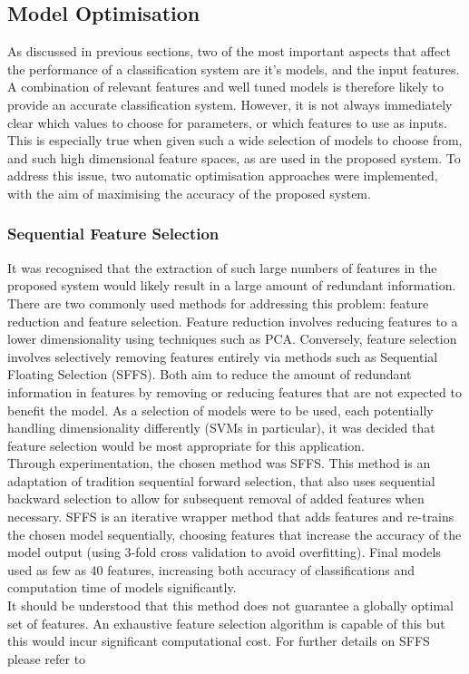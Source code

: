 \documentclass[titlepage, 12pt]{scrartcl} \usepackage{enumitem}
\begin{document}
\subsection{Model Optimisation}\label{optimise}
As discussed in previous sections, two of the most important aspects that affect
the performance of a classification system are it's models, and the input
features. A combination of relevant features and well tuned models is therefore
likely to provide an accurate classification system. However, it is not always
immediately clear which values to choose for parameters, or which features to use as
inputs. This is especially true when given such a wide selection of models to
choose from, and such high dimensional feature spaces, as are used in the
proposed system. To address this issue, two automatic optimisation approaches
were implemented, with the aim of maximising the accuracy of the proposed
system.

\subsubsection{Sequential Feature Selection}\label{SFS}
It was recognised that the extraction of such large numbers of features in the
proposed system would likely result in a large amount of redundant information.
There are two commonly used methods for addressing this problem: feature
reduction and feature selection. Feature reduction involves reducing features
to a lower dimensionality using techniques such as PCA. Conversely, feature
selection involves selectively removing features entirely via methods such as
Sequential Floating Selection (SFFS). Both aim to reduce the amount of
redundant information in features by removing or reducing features that are not
expected to benefit the model. As a selection of models were to be used, each
potentially handling dimensionality differently (SVMs in particular), it was
decided that feature selection would be most appropriate for this
application.\\

Through experimentation, the chosen method was SFFS. This method is an adaptation
of tradition sequential forward selection, that also uses sequential backward
selection to allow for subsequent removal of added features when necessary.
SFFS is an iterative wrapper method that adds features and re-trains the chosen
model sequentially, choosing features that increase the accuracy of the model
output (using 3-fold cross validation to avoid overfitting). Final models used
as few as 40 features, increasing both accuracy of classifications and
computation time of models significantly.\\
It should be understood that this method does not guarantee a globally optimal
set of features. An exhaustive feature selection algorithm is capable of this
but this would incur significant computational cost. For further details on
SFFS please refer to~\parencite[p.3]{Ferri1994}
\end{document}
